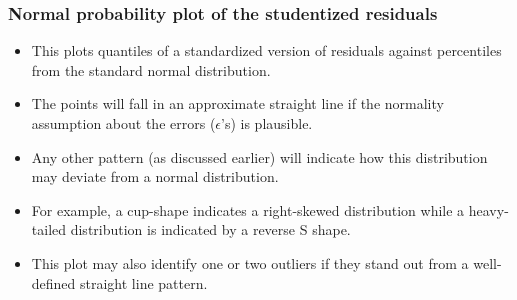 \documentclass[xcolor=dvipsnames,12pt]{beamer}
\begin{document}
\begin{frame}
\frametitle{Normal probability plot of the studentized residuals}
\begin{itemize}
\item This plots quantiles of a standardized version of residuals against percentiles
from the standard normal distribution.\\[.01in] 
\item The points will fall in an approximate straight line
if the normality assumption about the errors ($\epsilon$'s) is plausible.\\[.01in] 
\item Any other pattern (as discussed earlier) will indicate how this distribution may deviate from a normal distribution. \\[.01in] 
\item For example, a cup-shape indicates a 
right-skewed distribution while a heavy-tailed distribution is indicated by a reverse
S shape. \\[.01in] 
\item This plot may also identify one or two outliers if they stand out from
a well-defined straight line pattern.
\end{itemize}
\end{frame}
\end{document}
